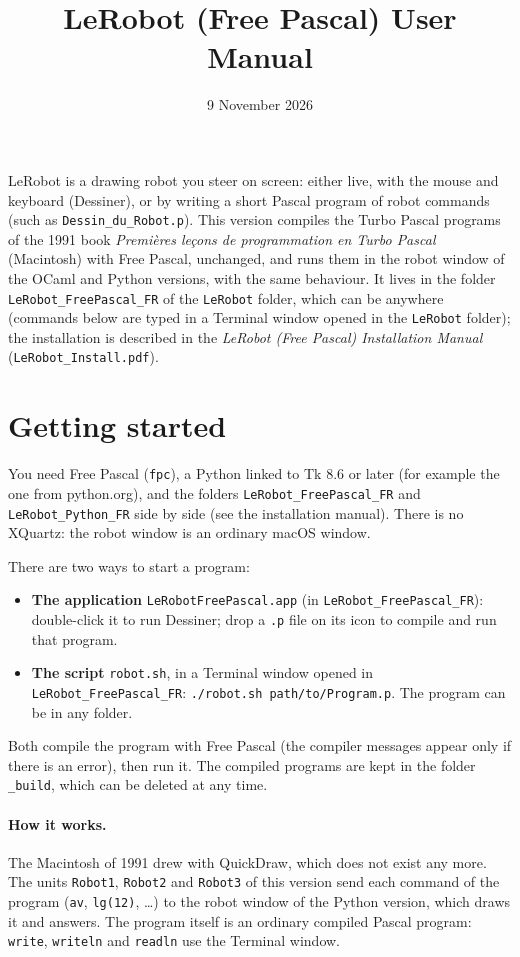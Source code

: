 \documentclass[11pt,a4paper]{article}
\title{LeRobot (Free Pascal) User Manual}
\author{}
\date{9 November 2026}
\newcommand{\kbd}[1]{\texttt{#1}}
\begin{document}
\maketitle

LeRobot is a drawing robot you steer on screen: either live, with the mouse
and keyboard (Dessiner), or by writing a short Pascal program of robot
commands (such as \kbd{Dessin\_du\_Robot.p}). This version compiles the
Turbo Pascal programs of the 1991 book \emph{Premières leçons de
programmation en Turbo Pascal} (Macintosh) with Free Pascal, unchanged, and
runs them in the robot window of the OCaml and Python versions, with the
same behaviour. It lives in
the folder \kbd{LeRobot\_FreePascal\_FR} of the \kbd{LeRobot} folder, which can
be anywhere (commands below are typed in a Terminal window opened in the
\kbd{LeRobot} folder); the installation
is described in the \emph{LeRobot (Free Pascal) Installation Manual}
(\kbd{LeRobot\_Install.pdf}).

\tableofcontents

\section{Getting started}

You need Free Pascal (\kbd{fpc}), a Python linked to Tk 8.6 or later (for
example the one from python.org), and the folders \kbd{LeRobot\_FreePascal\_FR}
and \kbd{LeRobot\_Python\_FR} side by side (see the installation manual). There
is no XQuartz: the robot window is an ordinary macOS window.

There are two ways to start a program:
\begin{itemize}
\item \textbf{The application} \kbd{LeRobotFreePascal.app} (in
  \kbd{LeRobot\_FreePascal\_FR}): double-click it to run Dessiner; drop a
  \kbd{.p} file on its icon to compile and run that program.
\item \textbf{The script} \kbd{robot.sh}, in a Terminal window opened in
  \kbd{LeRobot\_FreePascal\_FR}: \kbd{./robot.sh path/to/Program.p}. The
  program can be in any folder.
\end{itemize}
Both compile the program with Free Pascal (the compiler messages appear
only if there is an error), then run it. The compiled programs are kept in
the folder \kbd{\_build}, which can be deleted at any time.

\paragraph{How it works.} The Macintosh of 1991 drew with QuickDraw, which
does not exist any more. The units \kbd{Robot1}, \kbd{Robot2} and
\kbd{Robot3} of this version send each command of the program (\kbd{av},
\kbd{lg(12)}, \dots) to the robot window of the Python version, which draws
it and answers. The program itself is an ordinary compiled Pascal program:
\kbd{write}, \kbd{writeln} and \kbd{readln} use the Terminal window.
\end{document}
